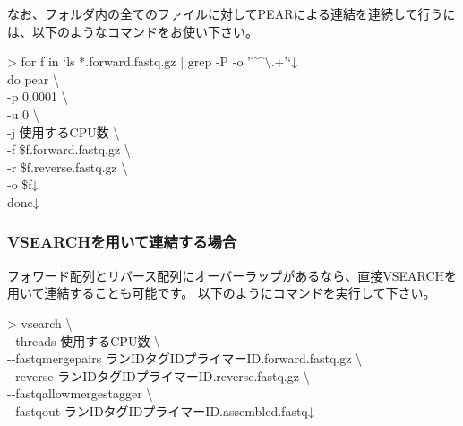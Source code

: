 \documentclass[titlepage,10pt,a4paper]{jsbook}
\newenvironment{cmd}{\begin{oframed}\raggedright\ttfamily\footnotesize\setlength{\baselineskip}{1.4em}}{\end{oframed}\vspace{-1em}}
\begin{document}
なお、フォルダ内の全てのファイルに対してPEARによる連結を連続して行うには、以下のようなコマンドをお使い下さい。

\begin{cmd}
{\textgreater} for f in `ls *.forward.fastq.gz | grep -P -o '{\textasciicircum}{\lbrack}{\textasciicircum}{\textbackslash}.{\rbrack}+'`↓\\
do pear {\textbackslash}\\
-p 0.0001 {\textbackslash}\\
-u 0 {\textbackslash}\\
-j 使用するCPU数 {\textbackslash}\\
-f \$f.forward.fastq.gz {\textbackslash}\\
-r \$f.reverse.fastq.gz {\textbackslash}\\
-o \$f↓\\
done↓
\end{cmd}

\subsubsection{VSEARCHを用いて連結する場合}

フォワード配列とリバース配列にオーバーラップがあるなら、直接VSEARCHを用いて連結することも可能です。
以下のようにコマンドを実行して下さい。

\begin{cmd}
{\textgreater} vsearch {\textbackslash}\\
{-}{-}threads 使用するCPU数 {\textbackslash}\\
{-}{-}fastq{\textunderscore}mergepairs ランID{\textunderscore}{\textunderscore}タグID{\textunderscore}{\textunderscore}プライマーID.forward.fastq.gz {\textbackslash}\\
{-}{-}reverse ランID{\textunderscore}{\textunderscore}タグID{\textunderscore}{\textunderscore}プライマーID.reverse.fastq.gz {\textbackslash}\\
{-}{-}fastq{\textunderscore}allowmergestagger {\textbackslash}\\
{-}{-}fastqout ランID{\textunderscore}{\textunderscore}タグID{\textunderscore}{\textunderscore}プライマーID.assembled.fastq↓
\end{cmd}
\end{document}
